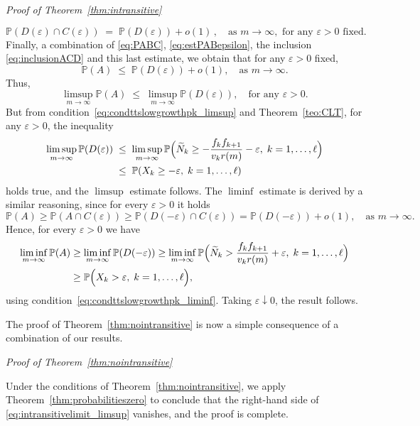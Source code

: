 \documentclass[reqno,a4paper,11pt]{amsart}
\makeatletter
\theoremstyle{remark}
\newcommand{\bb}[1]{{\mathbb #1}}
\numberwithin{equation}{section}
\renewenvironment{proof}[1][Proof]{\par
\pushQED{\qed}%
\normalfont \topsep6\p@\@plus6\p@\relax
\trivlist
\item\relax
{\itshape
#1\@addpunct{.}}\hspace\labelsep\ignorespaces
}{%
\popQED\endtrivlist\@endpefalse
}
\makeatother
\begin{document}
\begin{proof}[Proof of Theorem~\ref{thm:intransitive}]
%
$$
\bb P(D(\varepsilon)\cap C(\varepsilon))\;=\;\bb P(D(\varepsilon))+o(1)\,,\quad \text{as }m\to \infty, \text{ for any } \varepsilon>0 \text{ fixed}.
$$
%
Finally, a combination of \eqref{eq:PABC}, \eqref{eq:estPABepsilon}, the inclusion \eqref{eq:inclusionACD} and this last estimate, we obtain that for any $\varepsilon>0$ fixed,
%
$$
\bb P(A)\;\leq\; \bb P(D(\varepsilon))+o(1),\quad \text{as }m\to\infty.
$$
%
Thus,
%
$$
\limsup_{m\to\infty} \bb P(A)\;\leq\; \limsup_{m\to\infty} \bb P(D(\varepsilon)),\quad \text{for any }\varepsilon>0.
$$
%
But from condition~\eqref{eq:condttslowgrowthpk_limsup} and Theorem~\ref{teo:CLT}, for any $\varepsilon>0$, the inequality
%
\begin{align*}
\limsup_{m\to\infty} \bb P(D(\varepsilon))
    &\;\leq\; \limsup_{m\to\infty} \bb P\Bigl(\widetilde N_k \geq -\frac{f_kf_{k+1}}{v_kr(m)}-\varepsilon ,\; k=1,\hdots, \ell \Bigr)  \\ 
    &\;\leq \; \bb P(X_k\geq -\varepsilon, \; k=1,\hdots, \ell)
\end{align*}
%
%
holds true, and the $\limsup$ estimate follows. The $\liminf$ estimate is
derived by a similar reasoning, since for every $\varepsilon>0$ it holds
\begin{equation*}
\bb P(A)
    \ge \bb P(A \cap C(\varepsilon))
    \ge \bb P(D(-\varepsilon) \cap C(\varepsilon))
    = \bb P(D(-\varepsilon)) + o(1),\quad \text{as $m \to \infty$}.
\end{equation*}
Hence, for every $\varepsilon>0$ we have
\begin{align*}
\liminf_{m\to\infty} \bb P(A)
    &\ge \liminf_{m\to\infty} \bb P(D(-\varepsilon))
    \ge \liminf_{m\to\infty}
    \bb P\Bigl(\widetilde N_k > \frac{f_kf_{k+1}}{v_kr(m)}+\varepsilon ,\;
    k=1,\hdots, \ell \Bigr)\\
    &\ge \bb P\Bigl(X_k > \varepsilon ,\;
    k=1,\hdots, \ell \Bigr),
\end{align*}
using condition~\eqref{eq:condttslowgrowthpk_liminf}. Taking $\varepsilon \downarrow 0$, the result follows.
\end{proof}

The proof of Theorem~\ref{thm:nointransitive} is now a simple consequence of a combination of our results.

\begin{proof}[Proof of Theorem~\ref{thm:nointransitive}]
Under the conditions of Theorem~\ref{thm:nointransitive}, we apply
    Theorem~\ref{thm:probabilitieszero} to conclude that the right-hand side of
    \eqref{eq:intransitivelimit_limsup} vanishes, and the proof is complete.
\end{proof}
\end{document}
